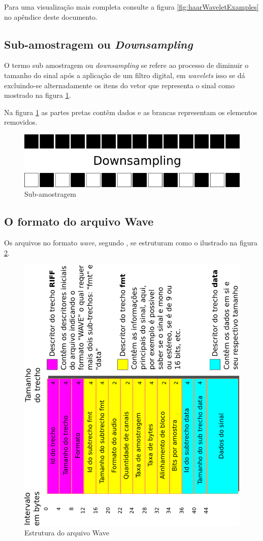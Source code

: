 			
			
			\par Para uma visualização mais completa consulte a figura \ref{fig:haarWaveletExamples} no apêndice deste documento.
			
		\subsection{Sub-amostragem ou \textit{Downsampling}}
			\par O termo sub amostragem ou \textit{downsampling} se refere ao processo de diminuir o tamanho do sinal após a aplicação de um  filtro digital, em \textit{wavelets} isso se dá excluindo-se alternadamente os itens do vetor que representa o sinal como mostrado na figura \ref{fig:downsampling}.
			
			\par Na figura \ref{fig:downsampling} as partes pretas contêm dados e as brancas representam os elementos removidos.
			\begin{figure}[h]
				\centering
				\includegraphics[width=0.7\linewidth]{images/downsampling}
				\caption{Sub-amostragem}
				\label{fig:downsampling}
			\end{figure}
		\subsection{O formato do arquivo Wave}
			\par Os arquivos no formato \textit{wave}, segundo \cite{WAVE2019}, se estruturam como o ilustrado na figura \ref{fig:wavePcmStructure}.
		
			\begin{figure}[h]
				\centering
				\includegraphics[width=0.45\linewidth, angle=-90]{images/wavePcmStructure.pdf}
				\caption{Estrutura do arquivo Wave}
				\label{fig:wavePcmStructure}
			\end{figure}
			
